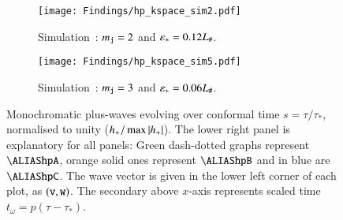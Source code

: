     \begin{figure}[ht!]\ContinuedFloat
        \begin{subfigure}[b]{\linewidth}
            \texttt{[image: Findings/hp\_kspace\_sim2.pdf]}
        \caption{Simulation~: $m_{\mathtt{j}}=2$ and $\varepsilon_\ast=0.12L_\#$.}
        \label{fig:results:h11:hp_kspace_sim2}
        \end{subfigure}
        \hfill
        \begin{subfigure}[b]{\linewidth}
            \texttt{[image: Findings/hp\_kspace\_sim5.pdf]}
        \caption{Simulation~: $m_{\mathtt{j}}=3$ and $\varepsilon_\ast=0.06L_\#$.}
        \label{fig:results:h11:hp_kspace_sim5}
        \end{subfigure}
        \caption{Monochromatic plus-waves evolving over conformal time $s=\tau/\tau_\ast$, normalised to unity ($h_+/\max{\abs{h_+}}$). The lower right panel is explanatory for all panels: Green dash-dotted graphs represent $\hpA$, orange solid ones represent $\hpB$ and in blue are $\hpC$. The wave vector is given in the lower left corner of each plot, as $(\mathtt{v},\mathtt{w})$. The secondary above $x$-axis represents scaled time $t_\omega =p (\tau-\tau_\ast)$.}
        \label{fig:results:h11:hp_kspace}
    \end{figure}


